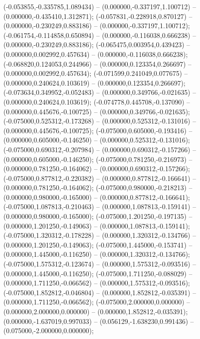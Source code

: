  (-0.053855,-0.335785,1.089434) -- (0.000000,-0.337197,1.100712) -- (0.000000,-0.435410,1.312871);
 (-0.057831,-0.228918,0.870127) -- (0.000000,-0.230249,0.883186) -- (0.000000,-0.337197,1.100712);
 (-0.061754,-0.114858,0.650894) -- (0.000000,-0.116038,0.666238) -- (0.000000,-0.230249,0.883186);
 (-0.065475,0.003954,0.439423) -- (0.000000,0.002992,0.457634) -- (0.000000,-0.116038,0.666238);
 (-0.068820,0.124053,0.244966) -- (0.000000,0.123354,0.266697) -- (0.000000,0.002992,0.457634);
 (-0.071599,0.241049,0.077675) -- (0.000000,0.240624,0.103619) -- (0.000000,0.123354,0.266697);
 (-0.073634,0.349952,-0.052483) -- (0.000000,0.349766,-0.021635) -- (0.000000,0.240624,0.103619);
 (-0.074778,0.445708,-0.137090) -- (0.000000,0.445676,-0.100725) -- (0.000000,0.349766,-0.021635);
 (-0.075000,0.525312,-0.173268) -- (0.000000,0.525312,-0.131016) -- (0.000000,0.445676,-0.100725);
 (-0.075000,0.605000,-0.193416) -- (0.000000,0.605000,-0.146250) -- (0.000000,0.525312,-0.131016);
 (-0.075000,0.690312,-0.207984) -- (0.000000,0.690312,-0.157266) -- (0.000000,0.605000,-0.146250);
 (-0.075000,0.781250,-0.216973) -- (0.000000,0.781250,-0.164062) -- (0.000000,0.690312,-0.157266);
 (-0.075000,0.877812,-0.220382) -- (0.000000,0.877812,-0.166641) -- (0.000000,0.781250,-0.164062);
 (-0.075000,0.980000,-0.218213) -- (0.000000,0.980000,-0.165000) -- (0.000000,0.877812,-0.166641);
 (-0.075000,1.087813,-0.210463) -- (0.000000,1.087813,-0.159141) -- (0.000000,0.980000,-0.165000);
 (-0.075000,1.201250,-0.197135) -- (0.000000,1.201250,-0.149063) -- (0.000000,1.087813,-0.159141);
 (-0.075000,1.320312,-0.178228) -- (0.000000,1.320312,-0.134766) -- (0.000000,1.201250,-0.149063);
 (-0.075000,1.445000,-0.153741) -- (0.000000,1.445000,-0.116250) -- (0.000000,1.320312,-0.134766);
 (-0.075000,1.575312,-0.123674) -- (0.000000,1.575312,-0.093516) -- (0.000000,1.445000,-0.116250);
 (-0.075000,1.711250,-0.088029) -- (0.000000,1.711250,-0.066562) -- (0.000000,1.575312,-0.093516);
 (-0.075000,1.852812,-0.046804) -- (0.000000,1.852812,-0.035391) -- (0.000000,1.711250,-0.066562);
 (-0.075000,2.000000,0.000000) -- (0.000000,2.000000,0.000000) -- (0.000000,1.852812,-0.035391);
 (0.000000,-1.637019,0.997033) -- (0.056129,-1.638230,0.991436) -- (0.075000,-2.000000,0.000000);
